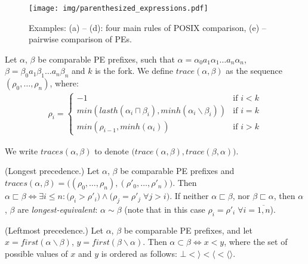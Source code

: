 \documentclass[AMA,STIX1COL]{WileyNJD-v2}
\newcommand{\Xl}{\langle}
\newcommand{\Xr}{\rangle}
\newcommand{\Xm}{\langle\!\rangle}
\begin{document}
\begin{figure}
\texttt{[image: img/parenthesized\_expressions.pdf]}
\vspace{-2em}
\caption{
Examples: (a) -- (d): four main rules of POSIX comparison,
(e) -- pairwise comparison of PEs.
}\label{fig_pe}
\end{figure}

    \begin{definition}
    \label{def_traces}
    Let $\alpha$, $\beta$ be comparable PE prefixes, such that
    $\alpha = \alpha_0 a_1 \alpha_1 \dots a_n \alpha_n$,
    $\beta = \beta_0 a_1 \beta_1 \dots a_n \beta_n$ and $k$ is the fork.
    We define $trace (\alpha, \beta)$ as the sequence $(\rho_0, \dots, \rho_n)$, where:
    \begin{align*}
    \rho_i = \begin{cases}
        -1 &\text{if } i < k \\[-0.2em]
        min (lasth (\alpha_i \sqcap \beta_i), minh(\alpha_i \backslash \beta_i)) &\text{if } i = k \\[-0.2em]
        min (\rho_{i-1}, minh(\alpha_i)) &\text{if } i > k
    \end{cases}
    \end{align*}

    We write $traces(\alpha, \beta)$ to denote $\big( trace (\alpha, \beta), trace (\beta, \alpha) \big)$.
    \end{definition}

    \begin{definition}\label{prec1}
    (Longest precedence.)
    Let $\alpha$, $\beta$ be comparable PE prefixes and
    $traces(\alpha, \beta) = \big( (\rho_0, \dots, \rho_n), (\rho'_0, \dots, \rho'_n) \big)$.
    Then $\alpha \sqsubset \beta \Leftrightarrow \exists i \leq n:
        \big( \rho_i > \rho'_i \big) \wedge
        \big( \rho_j = \rho'_j \; \forall j > i \big)$.
    If neither $\alpha \sqsubset \beta$, nor $\beta \sqsubset \alpha$,
    then $\alpha$, $\beta$ are \emph{longest-equivalent}: $\alpha \sim \beta$
    (note that in this case $\rho_i = \rho'_i \; \forall i = \overline {1, n}$).
    \end{definition}

    \begin{definition}\label{prec2}
    (Leftmost precedence.)
    Let $\alpha$, $\beta$ be comparable PE prefixes, and let
    $x = first (\alpha \backslash \beta)$,
    $y = first (\beta \backslash \alpha)$.
    Then $\alpha \subset \beta \Leftrightarrow x < y$, where
    the set of possible values of $x$ and $y$ is ordered as follows:
    $\bot < \Xr < \Xl < \Xm$.
    \end{definition}
\end{document}

